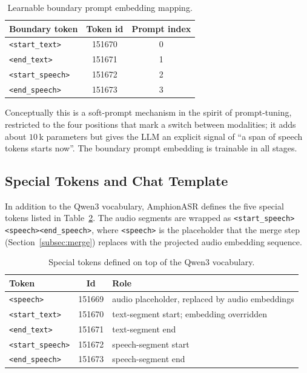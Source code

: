 \begin{table}[t]
  \caption{Learnable boundary prompt embedding mapping.}
  \label{tab:bound}
  \centering
  \small
  \begin{tabular}{lcc}
    \toprule
    Boundary token       & Token id   & Prompt index \\
    \midrule
    \texttt{<start\_text>}    & 151670     & 0 \\
    \texttt{<end\_text>}      & 151671     & 1 \\
    \texttt{<start\_speech>}  & 151672     & 2 \\
    \texttt{<end\_speech>}    & 151673     & 3 \\
    \bottomrule
  \end{tabular}
\end{table}

Conceptually this is a soft-prompt mechanism in the spirit of
prompt-tuning, restricted to the four positions that mark a switch
between modalities; it adds about $10$\,k parameters but gives the LLM
an explicit signal of ``a span of speech tokens starts now''. The
boundary prompt embedding is trainable in all stages.

\subsection{Special Tokens and Chat Template}
\label{subsec:tokens}

In addition to the Qwen3 vocabulary, AmphionASR defines the five
special tokens listed in Table~\ref{tab:tokens}. The audio segments
are wrapped as \verb|<start_speech><speech><end_speech>|, where
\verb|<speech>| is the placeholder that the merge step
(Section~\ref{subsec:merge}) replaces with the projected audio
embedding sequence.

\begin{table}[t]
  \caption{Special tokens defined on top of the Qwen3 vocabulary.}
  \label{tab:tokens}
  \centering
  \small
  \begin{tabular}{lcl}
    \toprule
    Token            & Id      & Role \\
    \midrule
    \texttt{<speech>}        & 151669 & audio placeholder, replaced by audio embeddings \\
    \texttt{<start\_text>}    & 151670 & text-segment start; embedding overridden \\
    \texttt{<end\_text>}      & 151671 & text-segment end \\
    \texttt{<start\_speech>}  & 151672 & speech-segment start \\
    \texttt{<end\_speech>}    & 151673 & speech-segment end \\
    \bottomrule
  \end{tabular}
\end{table}

